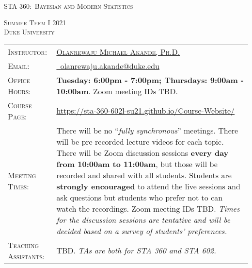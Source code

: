 \documentclass[11pt, a4paper]{article}
\begin{document}
\renewcommand{\arraystretch}{1.5}	


\begin{center}
{\Large \textsc{STA 360:\ Bayesian and Modern Statistics}}
\end{center}


\begin{center}
	\textsc{Summer Term I 2021} \\
	\textsc{Duke University} \\
\end{center}



\begin{center}
	\begin{minipage}[t]{.9\textwidth}
		\begin{tabular}{@{}L{3cm}L{12cm}}
			\toprule[0.065cm]
			\textsc{Instructor:} & \href{https://akandelanre.github.io.}{\textsc{Olanrewaju Michael Akande, Ph.D.}} \\
			\textsc{Email:} &\href{mailto:olanrewaju.akande@duke.edu}{\Envelope ~olanrewaju.akande@duke.edu} \\
			\textsc{Office Hours:} & \textbf{Tuesday: 6:00pm - 7:00pm; Thursdays: 9:00am - 10:00am}. Zoom meeting IDs TBD. \\
			\textsc{Course Page:} & \href{https://sta-360-602l-su21.github.io/Course-Website/}{https://sta-360-602l-su21.github.io/Course-Website/} \\
			\textsc{Meeting Times:} & There will be no ``\textit{fully synchronous}'' meetings. There will be pre-recorded lecture videos for each topic. There will be Zoom discussion sessions \textbf{every day from 10:00am to 11:00am}, but those will be recorded and shared with all students. Students are \textbf{strongly encouraged} to attend the live sessions and ask questions but students who prefer not to can watch the recordings. Zoom meeting IDs TBD. 
			\newline \textit{Times for the discussion sessions are tentative and will be decided based on a survey of students' preferences.} \\
			\textsc{Teaching Assistants:} & TBD.
			\newline \textit{TAs are both for STA 360 and STA 602.}\\ 

\end{tabular}
\end{minipage}
\end{center}
\end{document}
